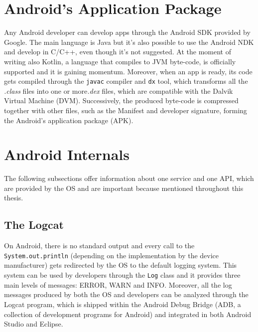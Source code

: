 \section{Android's Application Package}
Any Android developer can develop apps through the Android SDK provided by Google. The main language is Java but it's also possible to use the Android NDK and develop in C/C++, even though it's not suggested. At the moment of writing also Kotlin, a language that compiles to JVM byte-code, is officially supported and it is gaining momentum. Moreover, when an app is ready, its code gets compiled through the \texttt{javac}  compiler and \texttt{dx} tool, which transforms all the \emph{.class} files into one or more\emph{.dex} files, which are compatible with the Dalvik Virtual Machine (DVM). Successively, the produced byte-code is compressed together with other files, such as the Manifest and developer signature, forming the Android's application package (APK).

\section{Android Internals}
The following subsections offer information about one service and one API, which are provided by the OS and are important because mentioned throughout this thesis.

\subsection{The Logcat}
On Android, there is no standard output and every call to the \texttt{System.out.println} (depending on the implementation by the device manufacturer) gets redirected by the OS to the default logging system. This system can be used by developers through the \texttt{Log} class and it provides three main levels of messages: ERROR, WARN and INFO. Moreover, all the log messages produced by both the OS and developers can be analyzed through the Logcat program, which is shipped within the Android Debug Bridge (ADB, a collection of development programs for Android) and integrated in both Android Studio and Eclipse.

